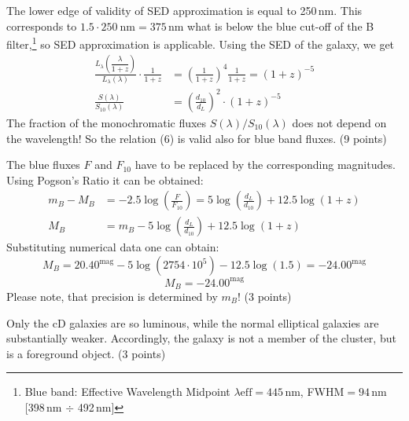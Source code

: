 \begin{description}
  The lower edge of validity of SED approximation is equal to 250\,nm. This
  corresponds to $1.5\cdot 250\ \mathrm{nm} = 375$\,nm what is below the blue
  cut-off of the B filter,\footnote{Blue band: Effective Wavelength Midpoint
  $\lambda\mathrm{eff}=445$\,nm, FWHM${}=94$\,nm
  [398\,nm $\div$ 492\,nm]} so SED approximation is applicable. Using the SED
  of the galaxy, we get
  \begin{align*}
    \frac{L_\lambda\!\left(\dfrac{\lambda}{1+z}\right)}{L_\lambda(\lambda)}
      \cdot \frac{1}{1+z}
      &= \left(\frac{1}{1+z}\right)^{4}\frac{1}{1+z}
       = (1+z)^{-5} \tag*{(5)} \\
    \frac{S(\lambda)}{S_{10}(\lambda)}
      &= \left(\frac{d_{10}}{d_L}\right)^{2}\cdot(1+z)^{-5} \tag*{(6)}
  \end{align*}
  The fraction of the monochromatic fluxes $S(\lambda)/S_{10}(\lambda)$ does
  not depend on the wavelength! So the relation (6) is valid also for blue
  band fluxes.
  \hfill(9 points)

\item[5)] The blue fluxes $F$ and $F_{10}$ have to be replaced by the
  corresponding magnitudes. Using Pogson's Ratio it can be obtained:
  \begin{align*}
    m_B - M_B &= -2.5\log\left(\frac{F}{F_{10}}\right)
      = 5\log\left(\frac{d_L}{d_{10}}\right) + 12.5\log(1+z) \\
    M_B &= m_B - 5\log\left(\frac{d_L}{d_{10}}\right)
      + 12.5\log(1+z) \tag*{(7)} %
  \end{align*}
  Substituting numerical data one can obtain:
  \[ M_B = 20.40^{\mathrm{mag}} - 5\log\!\left(2754\cdot 10^{5}\right)
     - 12.5\log(1.5) = -24.00^{\mathrm{mag}} \]
  \[ M_B = -24.00^{\mathrm{mag}} \tag*{(8)} \]
  Please note, that precision is determined by $m_B$!
  \hfill(3 points)

\item[6)] Only the cD galaxies are so luminous, while the normal elliptical
  galaxies are substantially weaker. Accordingly, the galaxy is not a member
  of the cluster, but is a foreground object.
  \hfill(3 points)
\end{description}

